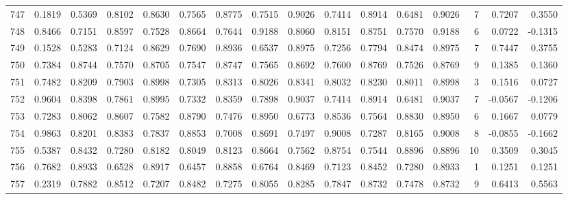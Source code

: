 \begin{tabular}{lrrrrrrrrrrrrrrr}
747 &      0.1819 &  0.5369 &  0.8102 &  0.8630 &  0.7565 &  0.8775 &  0.7515 &  0.9026 &  0.7414 &  0.8914 &   0.6481 &     0.9026 &      7 &                    0.7207 &                     0.3550 \\
748 &      0.8466 &  0.7151 &  0.8597 &  0.7528 &  0.8664 &  0.7644 &  0.9188 &  0.8060 &  0.8151 &  0.8751 &   0.7570 &     0.9188 &      6 &                    0.0722 &                    -0.1315 \\
749 &      0.1528 &  0.5283 &  0.7124 &  0.8629 &  0.7690 &  0.8936 &  0.6537 &  0.8975 &  0.7256 &  0.7794 &   0.8474 &     0.8975 &      7 &                    0.7447 &                     0.3755 \\
750 &      0.7384 &  0.8744 &  0.7570 &  0.8705 &  0.7547 &  0.8747 &  0.7565 &  0.8692 &  0.7600 &  0.8769 &   0.7526 &     0.8769 &      9 &                    0.1385 &                     0.1360 \\
751 &      0.7482 &  0.8209 &  0.7903 &  0.8998 &  0.7305 &  0.8313 &  0.8026 &  0.8341 &  0.8032 &  0.8230 &   0.8011 &     0.8998 &      3 &                    0.1516 &                     0.0727 \\
752 &      0.9604 &  0.8398 &  0.7861 &  0.8995 &  0.7332 &  0.8359 &  0.7898 &  0.9037 &  0.7414 &  0.8914 &   0.6481 &     0.9037 &      7 &                   -0.0567 &                    -0.1206 \\
753 &      0.7283 &  0.8062 &  0.8607 &  0.7582 &  0.8790 &  0.7476 &  0.8950 &  0.6773 &  0.8536 &  0.7564 &   0.8830 &     0.8950 &      6 &                    0.1667 &                     0.0779 \\
754 &      0.9863 &  0.8201 &  0.8383 &  0.7837 &  0.8853 &  0.7008 &  0.8691 &  0.7497 &  0.9008 &  0.7287 &   0.8165 &     0.9008 &      8 &                   -0.0855 &                    -0.1662 \\
755 &      0.5387 &  0.8432 &  0.7280 &  0.8182 &  0.8049 &  0.8123 &  0.8664 &  0.7562 &  0.8754 &  0.7544 &   0.8896 &     0.8896 &     10 &                    0.3509 &                     0.3045 \\
756 &      0.7682 &  0.8933 &  0.6528 &  0.8917 &  0.6457 &  0.8858 &  0.6764 &  0.8469 &  0.7123 &  0.8452 &   0.7280 &     0.8933 &      1 &                    0.1251 &                     0.1251 \\
757 &      0.2319 &  0.7882 &  0.8512 &  0.7207 &  0.8482 &  0.7275 &  0.8055 &  0.8285 &  0.7847 &  0.8732 &   0.7478 &     0.8732 &      9 &                    0.6413 &                     0.5563 \\

\end{tabular}
